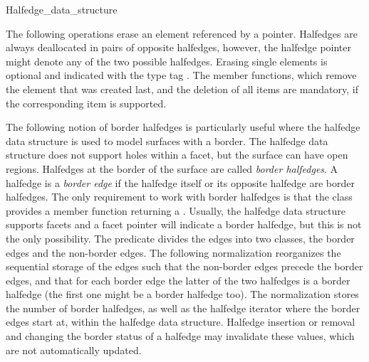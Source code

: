 \begin{ccClass}{Halfedge_data_structure}

The following operations erase an element referenced by a pointer.
Halfedges are always deallocated in pairs of opposite halfedges,
however, the halfedge pointer might denote any of the two possible
halfedges.  Erasing single elements is optional and indicated with the
type tag . The  member functions,
which remove the element that was created last, and the deletion of
all items are mandatory, if the corresponding item is supported.

\ccGlue
{} 
\ccGlue
{}

\ccGlue
{}
\ccGlue
{}
\ccGlue
{}


\begin{ccAdvanced}
  
The following notion of border halfedges is particularly useful
where the halfedge data structure is used to model surfaces with a
border. The halfedge data structure does not support holes within a
facet, but the surface can have open regions. Halfedges at the border
of the surface are called {\em border halfedges}. A halfedge is a {\em
  border edge\/} if the halfedge itself or its opposite halfedge are
border halfedges. The only requirement to work with border halfedges
is that the  class provides a member function
 returning a . Usually, the halfedge data
structure supports facets and a  facet pointer will indicate
a border halfedge, but this is not the only possibility.  The
 predicate divides the edges into two classes, the
border edges and the non-border edges. The following normalization
reorganizes the sequential storage of the edges such that the
non-border edges precede the border edges, and that for each border
edge the latter of the two halfedges is a border halfedge (the first
one might be a border halfedge too). The normalization stores the
number of border halfedges, as well as the halfedge iterator where the
border edges start at, within the halfedge data structure.  Halfedge
insertion or removal and changing the border status of a halfedge may
invalidate these values, which are not automatically updated.


\end{ccAdvanced}
\end{ccClass}
